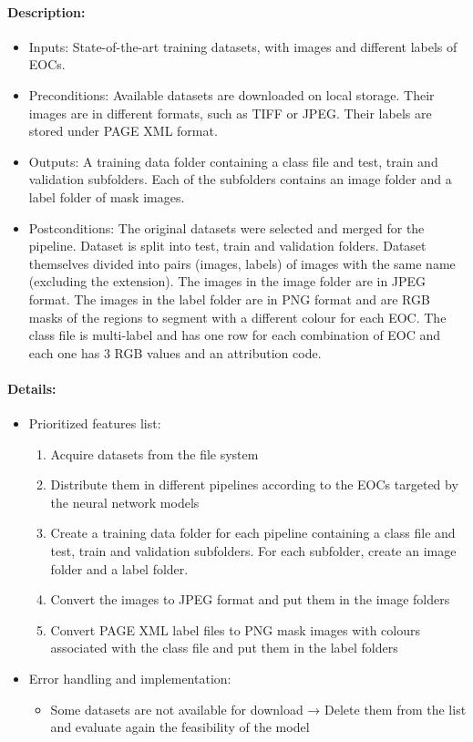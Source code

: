 \documentclass{polytech/polytech}
\numberwithin{figure}{chapter}
\begin{document}
\begin{appendix}
\paragraph{Description:}
 
\begin{itemize}
    \item Inputs: State-of-the-art training datasets, with images and different labels of EOCs. 
    \item Preconditions: Available datasets are downloaded on local storage.
Their images are in different formats, such as TIFF or JPEG.
Their labels are stored under PAGE XML format.

    \item Outputs: A training data folder containing a class file and test, train and validation subfolders. Each of the subfolders contains an image folder and a label folder of mask images.
    \item Postconditions: The original datasets were selected and merged for the pipeline.
Dataset is split into test, train and validation folders.
Dataset themselves divided into pairs (images, labels) of images with the same name (excluding the extension).
The images in the image folder are in JPEG format.
The images in the label folder are in PNG format and are RGB masks of the regions to segment with a different colour for each EOC.
The class file is multi-label and has one row for each combination of EOC and each one has 3 RGB values and an attribution code.
\end{itemize}

\paragraph{Details:}

\begin{itemize}
    \item Prioritized features list: 
    \begin{enumerate}
        \item	Acquire datasets from the file system
        \item	Distribute them in different pipelines according to the EOCs targeted by the neural network models
        \item	Create a training data folder for each pipeline containing a class file and test, train and validation subfolders. For each subfolder, create an image folder and a label folder.
        \item	Convert the images to JPEG format and put them in the image folders
        \item	Convert PAGE XML label files to PNG mask images with colours associated with the class file and put them in the label folders
    \end{enumerate}
    \item Error handling and implementation: 
    \begin{itemize}
        \item	Some datasets are not available for download → Delete them from the list and evaluate again the feasibility of the model
    \end{itemize}
\end{itemize}



\end{appendix}
\end{document}
